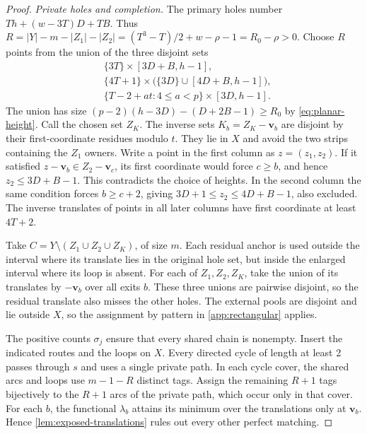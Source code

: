 \documentclass[10pt]{article}
\numberwithin{equation}{section}
\theoremstyle{definition}
\begin{document}
\begin{proof}
\emph{Private holes and completion.}
The primary holes number $Th+(w-3T)D+TB$. Thus $R=|Y|-m-|Z_1|-|Z_2|=(T^3-T)/2+w-\rho-1=R_0-\rho>0$. Choose $R$ points from the union of the three disjoint sets
\[
\begin{aligned}
 &\{3T\}\times[3D+B,h-1],\\
 &\{4T+1\}\times\bigl(\{3D\}\cup[4D+B,h-1]\bigr),\\
 &\{T-2+at:4\le a<p\}\times[3D,h-1].
\end{aligned}
\]
The union has size $(p-2)(h-3D)-(D+2B-1)\ge R_0$ by \cref{eq:planar-height}. Call the chosen set $Z_K$. The inverse sets $K_b=Z_K-\mathbf v_b$ are disjoint by their first-coordinate residues modulo $t$. They lie in $X$ and avoid the two strips containing the $Z_1$ owners. Write a point in the first column as $z=(z_1,z_2)$. If it satisfied $z-\mathbf v_b\in Z_2-\mathbf v_c$, its first coordinate would force $c\ge b$, and hence $z_2\le3D+B-1$. This contradicts the choice of heights. In the second column the same condition forces $b\ge c+2$, giving $3D+1\le z_2\le4D+B-1$, also excluded. The inverse translates of points in all later columns have first coordinate at least $4T+2$.

Take $C=Y\setminus(Z_1\cup Z_2\cup Z_K)$, of size $m$. Each residual anchor is used outside the interval where its translate lies in the original hole set, but inside the enlarged interval where its loop is absent. For each of $Z_1,Z_2,Z_K$, take the union of its translates by $-\mathbf v_b$ over all exits $b$. These three unions are pairwise disjoint, so the residual translate also misses the other holes. The external pools are disjoint and lie outside $X$, so the assignment by pattern in \cref{app:rectangular} applies.

The positive counts $\sigma_j$ ensure that every shared chain is nonempty. Insert the indicated routes and the loops on $X$. Every directed cycle of length at least 2 passes through $s$ and uses a single private path. In each cycle cover, the shared arcs and loops use $m-1-R$ distinct tags. Assign the remaining $R+1$ tags bijectively to the $R+1$ arcs of the private path, which occur only in that cover. For each $b$, the functional $\lambda_b$ attains its minimum over the translations only at $\mathbf v_b$. Hence \cref{lem:exposed-translations} rules out every other perfect matching.


\end{proof}
\end{document}
